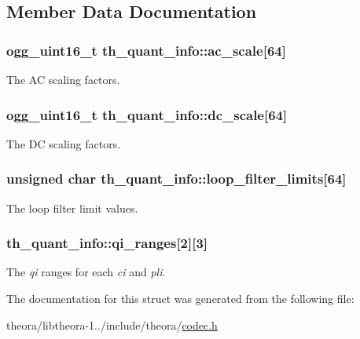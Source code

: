 \subsection{Member Data Documentation}
\hypertarget{structth__quant__info_a102f079c8f4a135dc0895c10768aeb06}{
\subsubsection[{ac\+\_\+scale}]{\setlength{\rightskip}{0pt plus 5cm}ogg\+\_\+uint16\+\_\+t th\+\_\+quant\+\_\+info\+::ac\+\_\+scale\mbox{[}64\mbox{]}}}\label{structth__quant__info_a102f079c8f4a135dc0895c10768aeb06}
The A\+C scaling factors. \hypertarget{structth__quant__info_ad5c1c0d1aa4127fcf864ae747d732ed9}{
\subsubsection[{dc\+\_\+scale}]{\setlength{\rightskip}{0pt plus 5cm}ogg\+\_\+uint16\+\_\+t th\+\_\+quant\+\_\+info\+::dc\+\_\+scale\mbox{[}64\mbox{]}}}\label{structth__quant__info_ad5c1c0d1aa4127fcf864ae747d732ed9}
The D\+C scaling factors. \hypertarget{structth__quant__info_a4ac56bf0a45b5743b36daf85d5cd9e33}{
\subsubsection[{loop\+\_\+filter\+\_\+limits}]{\setlength{\rightskip}{0pt plus 5cm}unsigned char th\+\_\+quant\+\_\+info\+::loop\+\_\+filter\+\_\+limits\mbox{[}64\mbox{]}}}\label{structth__quant__info_a4ac56bf0a45b5743b36daf85d5cd9e33}
The loop filter limit values. \hypertarget{structth__quant__info_a6feacf4b365e305a7df7b93d87ee7bb8}{
\subsubsection[{qi\+\_\+ranges}]{ th\+\_\+quant\+\_\+info\+::qi\+\_\+ranges\mbox{[}2\mbox{]}\mbox{[}3\mbox{]}}}\label{structth__quant__info_a6feacf4b365e305a7df7b93d87ee7bb8}
The {\itshape qi} ranges for each {\itshape ci} and {\itshape pli}. 

The documentation for this struct was generated from the following file\+:\begin{DoxyCompactItemize}
\item 
theora/libtheora-\/1../include/theora/\hyperlink{theora_2libtheora-1_81_81_2include_2theora_2codec_8h}{codec.\+h}\end{DoxyCompactItemize}
